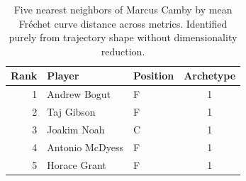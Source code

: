 \begin{table}[htbp]
  \centering\small
  \begin{tabular}{rllc}
    \toprule
    Rank & Player & Position & Archetype \\
    \midrule
    1 & Andrew Bogut & F & 1 \\
    2 & Taj Gibson & F & 1 \\
    3 & Joakim Noah & C & 1 \\
    4 & Antonio McDyess & F & 1 \\
    5 & Horace Grant & F & 1 \\
    \bottomrule
  \end{tabular}
  \caption{Five nearest neighbors of Marcus Camby by mean Fr\'{e}chet curve distance across metrics. Identified purely from trajectory shape without dimensionality reduction.}
  \label{tab:Marcus_Camby_frechet_curve_neighbors}
\end{table}

